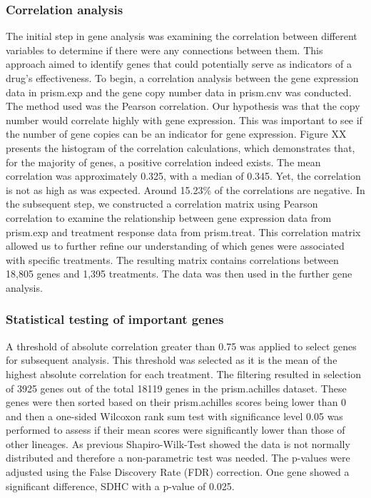 \documentclass[
  11pt,
]{article}
\begin{document}
\hypertarget{correlation-analysis}{%
\subsubsection{Correlation analysis}\label{correlation-analysis}}

The initial step in gene analysis was examining the correlation between
different variables to determine if there were any connections between
them. This approach aimed to identify genes that could potentially serve
as indicators of a drug's effectiveness. To begin, a correlation
analysis between the gene expression data in prism.exp and the gene copy
number data in prism.cnv was conducted. The method used was the Pearson
correlation. Our hypothesis was that the copy number would correlate
highly with gene expression. This was important to see if the number of
gene copies can be an indicator for gene expression. Figure XX presents
the histogram of the correlation calculations, which demonstrates that,
for the majority of genes, a positive correlation indeed exists. The
mean correlation was approximately 0.325, with a median of 0.345. Yet,
the correlation is not as high as was expected. Around 15.23\% of the
correlations are negative. In the subsequent step, we constructed a
correlation matrix using Pearson correlation to examine the relationship
between gene expression data from prism.exp and treatment response data
from prism.treat. This correlation matrix allowed us to further refine
our understanding of which genes were associated with specific
treatments. The resulting matrix contains correlations between 18,805
genes and 1,395 treatments. The data was then used in the further gene
analysis.

\hypertarget{statistical-testing-of-important-genes}{%
\subsubsection{Statistical testing of important
genes}\label{statistical-testing-of-important-genes}}

A threshold of absolute correlation greater than 0.75 was applied to
select genes for subsequent analysis. This threshold was selected as it
is the mean of the highest absolute correlation for each treatment. The
filtering resulted in selection of 3925 genes out of the total 18119
genes in the prism.achilles dataset. These genes were then sorted based
on their prism.achilles scores being lower than 0 and then a one-sided
Wilcoxon rank sum test with significance level 0.05 was performed to
assess if their mean scores were significantly lower than those of other
lineages. As previous Shapiro-Wilk-Test showed the data is not normally
distributed and therefore a non-parametric test was needed. The p-values
were adjusted using the False Discovery Rate (FDR) correction. One gene
showed a significant difference, SDHC with a p-value of 0.025.
\end{document}
